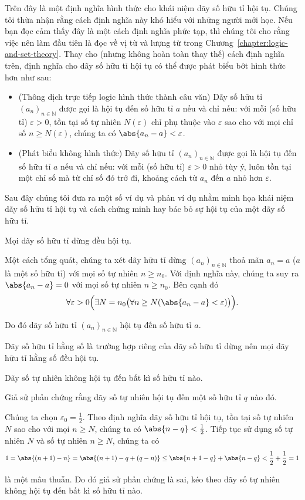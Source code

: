 Trên đây là một định nghĩa hình thức cho khái niệm dãy số hữu tỉ hội tụ. Chúng tôi thừa nhận rằng cách định nghĩa này khó hiểu với những người mới học. Nếu bạn đọc cảm thấy đây là một cách định nghĩa phức tạp, thì chúng tôi cho rằng việc nên làm đầu tiên là đọc về vị từ và lượng từ trong Chương~\ref{chapter:logic-and-set-theory}. Thay cho (nhưng không hoàn toàn thay thế) cách định nghĩa trên, định nghĩa cho dãy số hữu tỉ hội tụ có thể được phát biểu bớt hình thức hơn như sau:
\begin{itemize}
    \item (Thông dịch trực tiếp logic hình thức thành câu văn) Dãy số hữu tỉ ${(a_{n})}_{n\in\mathbb{N}}$ được gọi là hội tụ đến số hữu tỉ $a$ nếu và chỉ nếu: với mỗi (số hữu tỉ) $\varepsilon > 0$, tồn tại số tự nhiên $N(\varepsilon)$ chỉ phụ thuộc vào $\varepsilon$ sao cho với mọi chỉ số $n\geq N(\varepsilon)$, chúng ta có $\abs{a_{n} - a} < \varepsilon$.
    \item (Phát biểu không hình thức) Dãy số hữu tỉ ${(a_{n})}_{n\in\mathbb{N}}$ được gọi là hội tụ đến số hữu tỉ $a$ nếu và chỉ nếu: với mỗi (số hữu tỉ) $\varepsilon > 0$ nhỏ tùy ý, luôn tồn tại một chỉ số mà từ chỉ số đó trở đi, khoảng cách từ $a_{n}$ đến $a$ nhỏ hơn $\varepsilon$.
\end{itemize}

Sau đây chúng tôi đưa ra một số ví dụ và phản ví dụ nhằm minh họa khái niệm dãy số hữu tỉ hội tụ và cách chứng minh hay bác bỏ sự hội tụ của một dãy số hữu tỉ.
\begin{example}
    Mọi dãy số hữu tỉ dừng đều hội tụ.

    Một cách tổng quát, chúng ta xét dãy hữu tỉ dừng ${(a_{n})}_{n\in\mathbb{N}}$ thoả mãn $a_{n} = a$ ($a$ là một số hữu tỉ) với mọi số tự nhiên $n\geq n_{0}$. Với định nghĩa này, chúng ta suy ra $\abs{a_{n} - a} = 0$ với mọi số tự nhiên $n\geq n_{0}$. Bên cạnh đó
    \[
        \forall\varepsilon > 0\Bigl(\exists N=n_{0}\bigl(\forall n\geq N( \abs{a_{n} - a} < \varepsilon )\bigr)\Bigr).
    \]

    Do đó dãy số hữu tỉ  ${(a_{n})}_{n\in\mathbb{N}}$ hội tụ đến số hữu tỉ $a$.

    Dãy số hữu tỉ hằng số là trường hợp riêng của dãy số hữu tỉ dừng nên mọi dãy hữu tỉ hằng số đều hội tụ.
\end{example}

\begin{counterexample}
    Dãy số tự nhiên không hội tụ đến bất kì số hữu tỉ nào.

    Giả sử phản chứng rằng dãy số tự nhiên hội tụ đến một số hữu tỉ $q$ nào đó.

    Chúng ta chọn $\varepsilon_{0} = \frac{1}{2}$. Theo định nghĩa dãy số hữu tỉ hội tụ, tồn tại số tự nhiên $N$ sao cho với mọi $n\geq N$, chúng ta có $\abs{n - q} < \frac{1}{2}$. Tiếp tục sử dụng số tự nhiên $N$ và số tự nhiên $n\geq N$, chúng ta có
    \[
        1 = \abs{(n + 1) - n} = \abs{(n+1) - q + (q - n)} \leq \abs{n+1 - q} + \abs{n-q} < \frac{1}{2} + \frac{1}{2} = 1
    \]

    là một mâu thuẫn. Do đó giả sử phản chứng là sai, kéo theo dãy số tự nhiên không hội tụ đến bất kì số hữu tỉ nào.
\end{counterexample}

